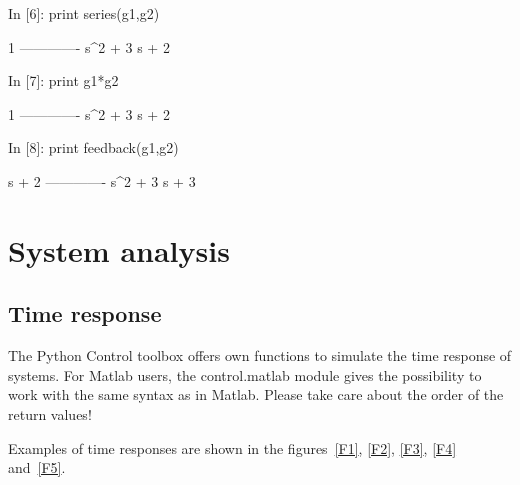 \begin{code}
In [6]: print series(g1,g2)

      1
-------------
s^2 + 3 s + 2


In [7]: print g1*g2

      1
-------------
s^2 + 3 s + 2
\end{code}

\begin{code}
In [8]: print feedback(g1,g2)

    s + 2
-------------
s^2 + 3 s + 3
\end{code}

\chapter{System analysis}

\section{Time response}

The Python Control toolbox offers own functions to simulate the time 
response of systems. For Matlab users, the control.matlab module gives the 
possibility to work with the same syntax as in Matlab.
Please take care about the order of the return values!

Examples of time responses are shown in the figures~\ref{F1}, \ref{F2}, 
\ref{F3}, \ref{F4} and~\ref{F5}.

